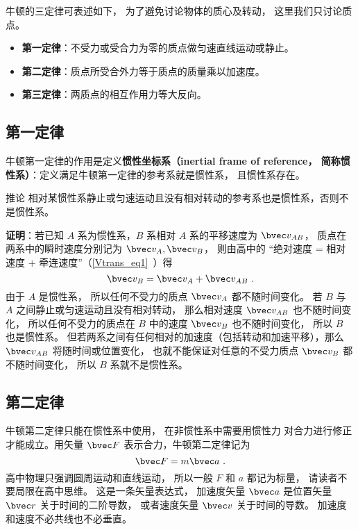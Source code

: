 

牛顿的三定律可表述如下， 为了避免讨论物体的质心及转动， 这里我们只讨论质点。
\begin{itemize}
\item \textbf{第一定律}：不受力或受合力为零的质点做匀速直线运动或静止。
\item \textbf{第二定律}：质点所受合外力等于质点的质量乘以加速度。
\item \textbf{第三定律}：两质点的相互作用力等大反向。
\end{itemize}

\subsection{第一定律}

牛顿第一定律的作用是定义\textbf{惯性坐标系（inertial frame of reference， 简称惯性系）}：定义满足牛顿第一定律的参考系就是惯性系， 且惯性系存在。

\begin{corollary}{推论}
相对某惯性系静止或匀速运动且没有相对转动的参考系也是惯性系，否则不是惯性系。
\end{corollary}
\textbf{证明}：若已知 $A$ 系为惯性系，$B$ 系相对 $A$ 系的平移速度为 $\bvec v_{AB}$， 质点在两系中的瞬时速度分别记为 $\bvec v_A, \bvec v_B$， 则由高中的 “绝对速度 = 相对速度 + 牵连速度”（\autoref{Vtrans_eq1}~）得
\begin{equation}
\bvec v_{B} = \bvec v_{A} + \bvec v_{AB}~.
\end{equation}
由于 $A$ 是惯性系， 所以任何不受力的质点 $\bvec v_{A}$ 都不随时间变化。 若 $B$ 与 $A$ 之间静止或匀速运动且没有相对转动， 那么相对速度 $\bvec v_{AB}$ 也不随时间变化， 所以任何不受力的质点在 $B$ 中的速度 $\bvec v_{B}$ 也不随时间变化， 所以 $B$ 也是惯性系。 但若两系之间有任何相对的加速度（包括转动和加速平移），那么 $\bvec v_{AB}$ 将随时间或位置变化， 也就不能保证对任意的不受力质点 $\bvec v_B$ 都不随时间变化， 所以 $B$ 系就不是惯性系。

\subsection{第二定律}

牛顿第二定律只能在惯性系中使用， 在非惯性系中需要用惯性力 对合力进行修正才能成立。用矢量 $\bvec F$ 表示合力，牛顿第二定律记为
\begin{equation}\label{New3_eq1}
\bvec F = m\bvec a~.
\end{equation}
高中物理只强调圆周运动和直线运动， 所以一般 $F$ 和 $a$ 都记为标量， 请读者不要局限在高中思维。 这是一条矢量表达式， 加速度矢量 $\bvec a$ 是位置矢量 $\bvec r$ 关于时间的二阶导数， 或者速度矢量 $\bvec v$ 关于时间的导数。 加速度和速度不必共线也不必垂直。

